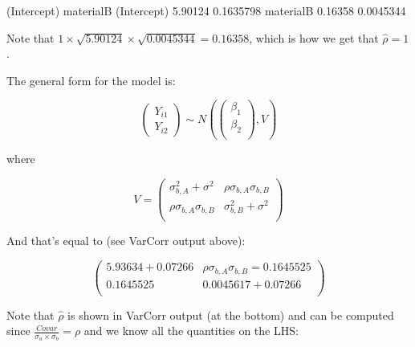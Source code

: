 \documentclass[12pt]{amsart}
\begin{document}
\begin{Schunk}
\begin{Soutput}
            (Intercept) materialB
(Intercept)     5.90124 0.1635798
materialB       0.16358 0.0045344
\end{Soutput}
\end{Schunk}

Note that $1\times {}\times {}=0.16358$, which is how we get that $\hat{\rho}=1$.

The general form for the model is:

\begin{equation}
\begin{pmatrix}
Y_{i1}\\
Y_{i2}
\end{pmatrix}
\sim
N\left( 
\begin{pmatrix}
\beta_1\\
\beta_2\\
\end{pmatrix}
,
V
\right)
\end{equation}

where 

\begin{equation}
V =
\begin{pmatrix}
\sigma^2_{b,A} + \sigma^2  &  \rho\sigma_{b,A}\sigma_{b,B}\\
\rho\sigma_{b,A}\sigma_{b,B} & \sigma^2_{b,B}+\sigma^2  \\       
\end{pmatrix}
\end{equation}

And that's equal to (see VarCorr output above):


\begin{equation}
\begin{pmatrix}
5.93634+0.07266  & \rho\sigma_{b,A}\sigma_{b,B}=0.1645525\\
 0.1645525 & 0.0045617+ 0.07266\\
\end{pmatrix}
\end{equation}


Note that $\hat{\rho}$ is shown in VarCorr output (at the bottom) and can be computed since $=\rho$ and we know all the quantities on the LHS:
\end{document}
